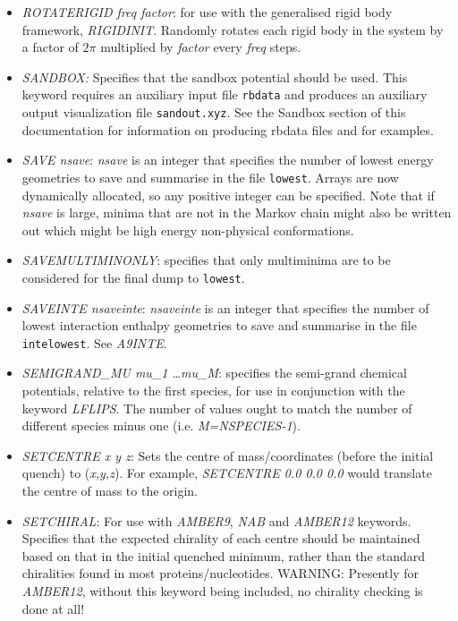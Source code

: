 \documentclass[12pt,a4paper,dvips]{article}
\begin{document}
\begin{itemize}
\item {\it ROTATERIGID freq factor}: for use with the generalised rigid body framework, 
{\it RIGIDINIT}. Randomly rotates each rigid body in the system by a factor of $2\pi$ multiplied by {\it factor} every {\it freq} steps.

\item {\it SANDBOX\/:} Specifies that the sandbox potential should be used. This keyword requires an auxiliary input file {\tt rbdata} and produces an auxiliary output visualization file {\tt sandout.xyz}. See the Sandbox section of this documentation for information on producing rbdata files and for examples.

\item {\it SAVE nsave\/}: {\it nsave\/} is an integer that specifies the number of lowest
energy geometries to save and summarise in the file {\tt lowest}. 
Arrays are now dynamically allocated, so any positive integer can be specified. Note that if {\it nsave\/} is large, minima that are not in the Markov chain might also be written out which might be high energy non-physical conformations.  

\item {\it SAVEMULTIMINONLY\/}: specifies that only multiminima are to be considered for the final dump to {\tt lowest}.

\item {\it SAVEINTE nsaveinte\/}: {\it nsaveinte\/} is an integer that specifies the number of lowest
interaction enthalpy geometries to save and summarise in the file {\tt intelowest}. See {\it A9INTE\/}. 

\item {\it SEMIGRAND\_MU mu\_1 \dots mu\_M\/}: specifies the semi-grand chemical potentials, relative to the first species, for use in conjunction with the keyword {\it LFLIPS\/}. The number of values ought to match the number of different species minus one (i.e. {\it M=NSPECIES-1}).

\item {\it SETCENTRE x y z\/}: Sets the centre of mass/coordinates (before the initial quench) to ({\it x,y,z\/}). For example, {\it SETCENTRE 0.0 0.0 0.0\/}
would translate the centre of mass to the origin.

\item {\it SETCHIRAL}: For use with {\it AMBER9}, {\it NAB} and {\it AMBER12} keywords. Specifies that the expected chirality of each centre should be
maintained based on that in the initial quenched minimum, rather than the standard chiralities found in most proteins/nucleotides. 
WARNING: Presently for {\it AMBER12}, without this keyword being included, no chirality checking is done at all!


\end{itemize}
\end{document}
